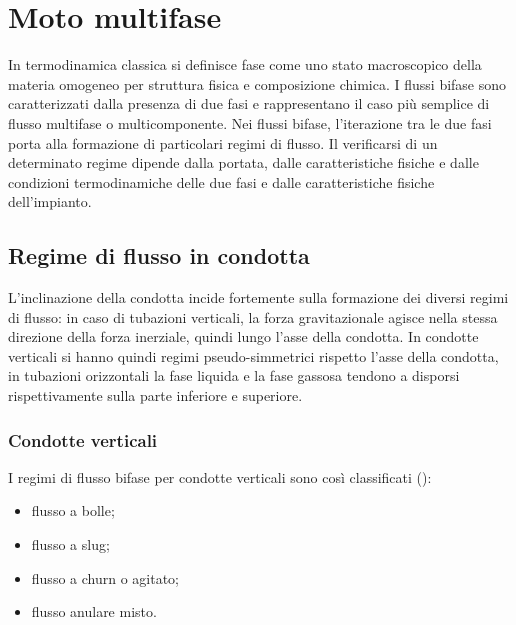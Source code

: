 \section{Moto multifase}
In termodinamica classica si definisce fase come uno stato macroscopico della materia omogeneo per struttura fisica e composizione chimica. I flussi bifase sono caratterizzati dalla presenza di due fasi e rappresentano il caso più semplice di flusso multifase o multicomponente. Nei flussi bifase, l'iterazione tra le due fasi porta alla formazione di particolari regimi di flusso. Il verificarsi di un determinato regime dipende dalla portata, dalle caratteristiche fisiche e dalle condizioni termodinamiche delle due fasi e dalle caratteristiche fisiche dell'impianto.

\subsection{Regime di flusso in condotta}
L'inclinazione della condotta incide fortemente sulla formazione dei diversi regimi di flusso: in caso di tubazioni verticali, la forza gravitazionale agisce nella stessa direzione della forza inerziale, quindi lungo l'asse della condotta. In condotte verticali si hanno quindi regimi pseudo-simmetrici rispetto l'asse della condotta, in tubazioni orizzontali la fase liquida e la fase gassosa tendono a disporsi rispettivamente sulla parte inferiore e superiore. 

\subsubsection{Condotte verticali} \label{sssec:verticali}
I regimi di flusso bifase per condotte verticali sono così classificati ():
\begin{itemize}
    \item flusso a bolle;
    \item flusso a slug;
    \item flusso a churn o agitato;
    \item flusso anulare misto.
\end{itemize}

